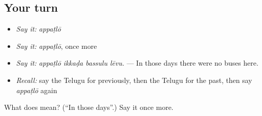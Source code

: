 \subsection*{Your turn}
\begin{itemize}
\raggedright
  \item \emph{Say it:} \emph{appaṭlō}
  \item \emph{Say it:} \emph{appaṭlō}, once more
  \item \emph{Say it:} \emph{appaṭlō ikkaḍa bassulu lēvu.} — In those days there were no buses here.
  \item \emph{Recall:} say the Telugu for previously, then the Telugu for the past, then say \emph{appaṭlō} again
\end{itemize}

\begin{tcolorbox}[breakable,colback=teal!4,colframe=teal!35!black,title={Before you move on}]
What does  mean? (\textquotedblleft{}In those days\textquotedblright{}.) Say it once more.
\end{tcolorbox}
